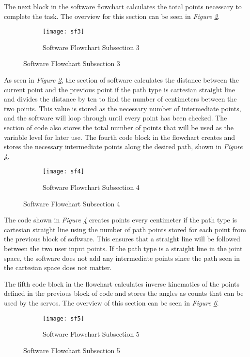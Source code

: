The next block in the software flowchart calculates the total points necessary to complete the task. The overview for this section can be seen in \emph{Figure \ref{fig:sf3}}.

\begin{figure}[htp]\ContinuedFloat
  \begin{subfigure}[c]{\textwidth}
  \center
  \texttt{[image: sf3]}
  \caption{Software Flowchart Subsection 3}
  \label{fig:sf3}
  \end{subfigure}
\end{figure}

As seen in \emph{Figure \ref{fig:sf3}}, the section of software calculates the distance between the current point and the previous point if the path type is cartesian straight line and divides the distance by ten to find the number of centimeters between the two points. This value is stored as the necessary number of intermediate points, and the software will loop through until every point has been checked. The section of code also stores the total number of points that will be used as the variable level for later use.
\newpage
The fourth code block in the flowchart creates and stores the necessary intermediate points along the desired path, shown in \emph{Figure \ref{fig:sf4}}.

\begin{figure}[htp] \ContinuedFloat
  \begin{subfigure}[c]{\textwidth}
  \center
  \texttt{[image: sf4]}
  \caption{Software Flowchart Subsection 4}
  \label{fig:sf4}
  \end{subfigure}
\end{figure}

The code shown in \emph{Figure \ref{fig:sf4}} creates points every centimeter if the path type is cartesian straight line using the number of path points stored for each point from the previous block of software. This ensures that a straight line will be followed between the two user input points. If the path type is a straight line in the joint space, the software does not add any intermediate points since the path seen in the cartesian space does not matter.

The fifth code block in the flowchart calculates inverse kinematics of the points defined in the previous block of code and stores the angles as counts that can be used by the servos. The overview of this section can be seen in \emph{Figure \ref{fig:sf5}}.

\begin{figure}[htp] \ContinuedFloat
  \begin{subfigure}[c]{\textwidth}
  \center
  \texttt{[image: sf5]}
  \caption{Software Flowchart Subsection 5}
  \label{fig:sf5}
  \end{subfigure}
\end{figure}

